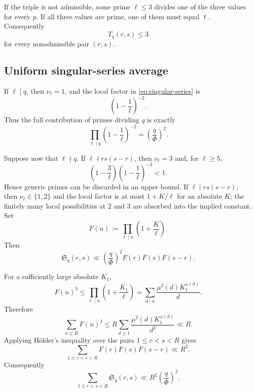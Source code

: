 \documentclass[11pt]{article}
\theoremstyle{definition}
\theoremstyle{remark}
\newcommand{\Ss}{\mathfrak S}
\begin{document}
If the triple is not admissible, some prime $\ell\le3$ divides one of the three values for every $p$.
If all three values are prime, one of them must equal $\ell$.
Consequently
\begin{equation}\label{eq:nonadmissible}
  T_q(r,s)\le3
\end{equation}
for every nonadmissible pair $(r,s)$.

\subsection{Uniform singular-series average}

If $\ell\mid q$, then $\nu_\ell=1$, and the local factor in \eqref{eq:singular-series} is
\[
  \left(1-\frac1\ell\right)^{-2}.
\]
Thus the full contribution of primes dividing $q$ is exactly
\begin{equation}\label{eq:q-factor}
  \prod_{\ell\mid q}\left(1-\frac1\ell\right)^{-2}
  =\left(\frac q\Phi\right)^2.
\end{equation}

Suppose now that $\ell\nmid q$.
If $\ell\nmid rs(s-r)$, then $\nu_\ell=3$ and, for $\ell\ge5$,
\[
  \left(1-\frac3\ell\right)\left(1-\frac1\ell\right)^{-3}<1.
\]
Hence generic primes can be discarded in an upper bound.
If $\ell\mid rs(s-r)$, then $\nu_\ell\in\{1,2\}$ and the local factor is at most $1+K/\ell$ for an absolute $K$; the finitely many local possibilities at $2$ and $3$ are absorbed into the implied constant.
Set
\[
  F(n):=\prod_{\ell\mid n}\left(1+\frac K\ell\right).
\]
Then
\begin{equation}\label{eq:series-majorant}
  \Ss_q(r,s)\ll
  \left(\frac q\Phi\right)^2F(r)F(s)F(s-r).
\end{equation}

For a sufficiently large absolute $K_1$,
\[
  F(n)^3\le
  \prod_{\ell\mid n}\left(1+\frac{K_1}{\ell}\right)
  =\sum_{d\mid n}\frac{\mu^2(d)K_1^{\omega(d)}}{d}.
\]
Therefore
\begin{equation}\label{eq:Fmean}
  \sum_{n\le R}F(n)^3
  \le R\sum_{d\ge1}\frac{\mu^2(d)K_1^{\omega(d)}}{d^2}
  \ll R.
\end{equation}
Applying H\"older's inequality over the pairs $1\le r<s<R$ gives
\begin{equation}\label{eq:holder}
  \sum_{1\le r<s<R}F(r)F(s)F(s-r)\ll R^2.
\end{equation}
Consequently
\begin{equation}\label{eq:series-average}
  \sum_{1\le r<s<R}\Ss_q(r,s)
  \ll R^2\left(\frac q\Phi\right)^2.
\end{equation}
\end{document}
